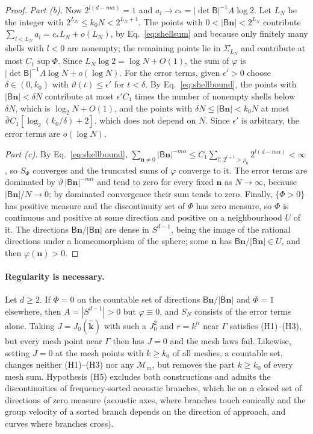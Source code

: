 \documentclass[aps,prb,10pt,onecolumn,amsmath,amssymb,superscriptaddress,nofootinbib]{revtex4-2}
\theoremstyle{plain}
\begin{document}
\begin{proof}
\emph{Part (b).} Now $2^{l(d-m\alpha)}=1$ and $a_l\to c_\ast=|\det\mathsf B|^{-1}A\log2$. Let $L_N$ be the
integer with $2^{L_N}\le k_0N<2^{L_N+1}$. The points with $0<|\mathsf B\mathbf n|<2^{L_N}$ contribute
$\sum_{l<L_N}a_l=c_\ast L_N+o(L_N)$, by Eq.~\eqref{eq:shellsum} and because only finitely many shells with
$l<0$ are nonempty; the remaining points lie in $\Sigma_{L_N}$ and contribute at most $C_1\sup\Phi$. Since
$L_N\log2=\log N+O(1)$, the sum of $\varphi$ is $|\det\mathsf B|^{-1}A\log N+o(\log N)$. For the error
terms, given $\epsilon'>0$ choose $\delta\in(0,k_0)$ with $\vartheta(t)\le\epsilon'$ for $t<\delta$. By
Eq.~\eqref{eq:shellbound}, the points with $|\mathsf B\mathbf n|<\delta N$ contribute at most $\epsilon'C_1$
times the number of nonempty shells below $\delta N$, which is $\log_2N+O(1)$, and the points with
$\delta N\le|\mathsf B\mathbf n|<k_0N$ at most $\bar\vartheta C_1[\log_2(k_0/\delta)+2]$, which does not depend
on $N$. Since $\epsilon'$ is arbitrary, the error terms are $o(\log N)$.

\emph{Part (c).} By Eq.~\eqref{eq:shellbound}, $\sum_{\mathbf n\ne0}|\mathsf B\mathbf n|^{-m\alpha}\le
C_1\sum_{l:\,2^{l+1}>\rho_0}2^{l(d-m\alpha)}<\infty$, so $S_\Phi$ converges and the truncated sums of
$\varphi$ converge to it. The error terms are dominated by $\bar\vartheta\,|\mathsf B\mathbf n|^{-m\alpha}$ and
tend to zero for every fixed $\mathbf n$ as $N\to\infty$, because $|\mathsf B\mathbf n|/N\to0$; by dominated
convergence their sum tends to zero. Finally, $\{\Phi>0\}$ has positive measure and the discontinuity set
of $\Phi$ has zero measure, so $\Phi$ is continuous and positive at some direction and positive on a
neighbourhood $U$ of it. The directions $\mathsf B\mathbf n/|\mathsf B\mathbf n|$ are dense in $S^{d-1}$,
being the image of the rational directions under a homeomorphism of the sphere; some $\mathbf n$ has
$\mathsf B\mathbf n/|\mathsf B\mathbf n|\in U$, and then $\varphi(\mathbf n)>0$.
\end{proof}

\paragraph*{Regularity is necessary.}
Let $d\ge2$. If $\Phi=0$ on the countable set of directions $\mathsf B\mathbf n/|\mathsf B\mathbf n|$ and $\Phi=1$
elsewhere, then $A=|S^{d-1}|>0$ but $\varphi\equiv0$, and $S_N$ consists of the error terms alone. Taking
$J=J_0(\hat{\mathbf k})$ with such a $J_0^2$ and $r=k^\alpha$ near $\Gamma$ satisfies (H1)--(H3), but every
mesh point near $\Gamma$ then has $J=0$ and the mesh laws fail. Likewise, setting $J=0$ at the mesh points
with $k\ge k_0$ of all meshes, a countable set, changes neither (H1)--(H3) nor any $\mathcal M_m$, but
removes the part $k\ge k_0$ of every mesh sum. Hypothesis (H5) excludes both constructions and admits the
discontinuities of frequency-sorted acoustic branches, which lie on a closed set of directions of zero
measure (acoustic axes, where branches touch conically and the group velocity of a sorted branch depends
on the direction of approach, and curves where branches cross).
\end{document}
